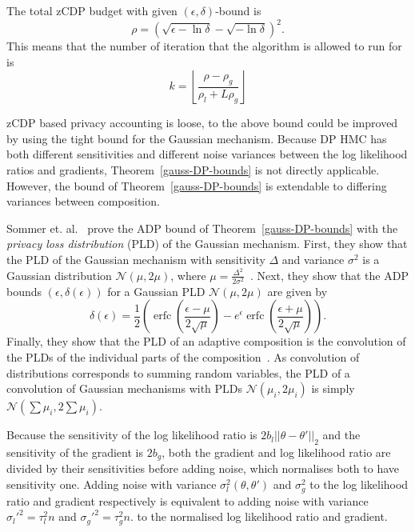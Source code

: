 \documentclass[english,twoside,openright]{HYgraduMLDS}
\newcommand{\caln}{{\mathcal{N}}}
\DeclareMathOperator{\erfc}{erfc}
\begin{document}
The total zCDP budget with given \((\epsilon, \delta)\)-bound is 
\[
    \rho = \left(\sqrt{\epsilon - \ln \delta} - \sqrt{-\ln \delta}\right)^2.
\]
This means that the number of iteration that the algorithm is allowed to run for 
is 
\[
    k = \left\lfloor\frac{\rho - \rho_{g}}{\rho_l + L\rho_g}\right\rfloor
\]

zCDP based privacy accounting is loose, to the above bound could be improved 
by using the tight bound for the Gaussian mechanism. Because DP HMC has both
different sensitivities and different noise variances between the log likelihood
ratios and gradients, Theorem~\ref{gauss-DP-bounds} is not directly applicable.
However, the bound of Theorem~\ref{gauss-DP-bounds} is extendable to differing variances
between composition.

Sommer et. al.~\cite{Sommer2019} prove the ADP bound of Theorem~\ref{gauss-DP-bounds} with
the \emph{privacy loss distribution} (PLD) of the Gaussian mechanism. First, they
show that the PLD of the Gaussian mechanism with sensitivity \(\Delta\) and variance
\(\sigma^{2}\) is a Gaussian distribution
\(\caln(\mu, 2\mu)\), where \(\mu = \frac{\Delta^{2}}{2\sigma^{2}}\)~\cite[Lemma 11]{Sommer2019}.
Next, they show that the ADP bounds \((\epsilon, \delta(\epsilon))\) for a
Gaussian PLD \(\caln(\mu, 2\mu)\) are given by~\cite[Lemma 12]{Sommer2019}
\[
  \delta(\epsilon) = \frac{1}{2}\left(
    \erfc\left(\frac{\epsilon - \mu}{2\sqrt{\mu}}\right)
    - e^{\epsilon}\erfc\left(\frac{\epsilon + \mu}{2\sqrt{\mu}}\right)\right).
\]
Finally, they show that the PLD of an adaptive composition is the convolution of
the PLDs of the individual parts of the composition~\cite[Theorem 1]{Sommer2019}.
As convolution of distributions corresponds to summing random variables, the PLD of a
convolution of Gaussian mechanisms with PLDs \(\caln(\mu_{i}, 2\mu_{i})\) is
simply \(\caln(\sum \mu_{i}, 2\sum \mu_{i})\).

Because the sensitivity of the log likelihood ratio is
\(2b_{l}||\theta - \theta'||_{2}\) and the sensitivity of the gradient is
\(2b_{g}\), both the gradient and log likelihood ratio are divided by their
sensitivities before adding noise, which normalises both to have sensitivity
one. Adding noise with variance \(\sigma_{l}^2(\theta, \theta')\)
and \(\sigma_{g}^{2}\) to the log likelihood ratio and gradient respectively
is equivalent to adding noise with variance
\(\sigma_{l}'^{2} = \tau_{l}^{2}n\) and \(\sigma_{g}'^{2} = \tau_{g}^{2}n\).
to the normalised log likelihood ratio and gradient.
\end{document}
